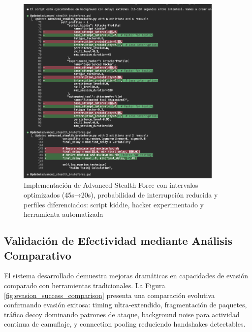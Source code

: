 \begin{figure}[!htbp]
\centering
\includegraphics[width=0.9\textwidth]{figures/scriptbruteforceiteacion3mejora.png}
\caption{Implementación de Advanced Stealth Force con intervalos optimizados (45s→20s), probabilidad de interrupción reducida y perfiles diferenciados: script kiddie, hacker experimentado y herramienta automatizada}
\label{fig:advanced_stealth_force}
\end{figure}

\subsection{Validación de Efectividad mediante Análisis Comparativo}
\FloatBarrier

El sistema desarrollado demuestra mejoras dramáticas en capacidades de evasión comparado con herramientas tradicionales. La Figura \ref{fig:evasion_success_comparison} presenta una comparación evolutiva confirmando evasión exitosa: timing ultra-extendido, fragmentación de paquetes, tráfico decoy dominando patrones de ataque, background noise para actividad continua de camuflaje, y connection pooling reduciendo handshakes detectables.

